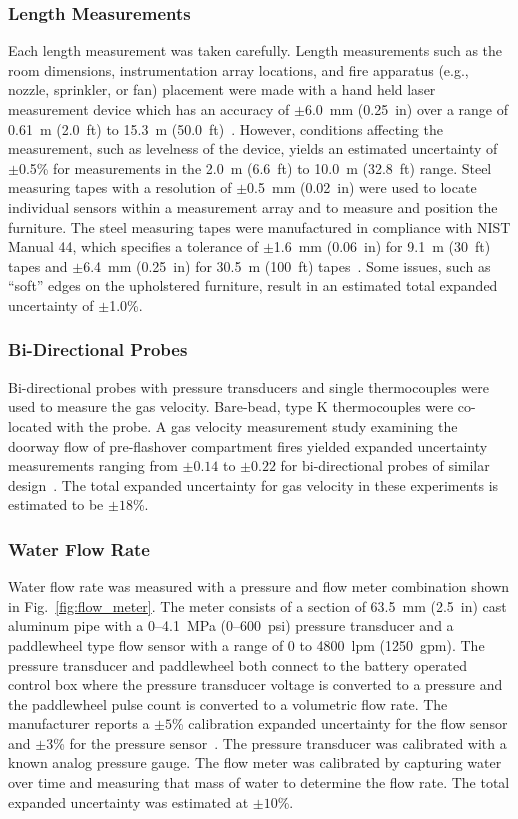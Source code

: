 \documentclass[12pt,oneside]{book}
\begin{document}
\subsubsection{Length Measurements}
Each length measurement was taken carefully. Length measurements such as the room dimensions, instrumentation array locations, and fire apparatus (e.g., nozzle, sprinkler, or fan) placement were made with a hand held laser measurement device which has an accuracy of $\pm$6.0~mm (0.25~in) over a range of 0.61~m (2.0~ft) to 15.3~m (50.0~ft)~\cite{StanleyTools}.  However, conditions affecting the measurement, such as levelness of the device, yields an estimated uncertainty of $\pm$0.5\% for measurements in the 2.0~m (6.6~ft) to 10.0~m (32.8~ft) range. Steel measuring tapes with a resolution of $\pm$0.5~mm (0.02~in) were used to locate individual sensors within a measurement array and to measure and position the furniture. The steel measuring tapes were manufactured in compliance with NIST Manual 44, which specifies a tolerance of $\pm$1.6~mm (0.06~in) for 9.1~m (30~ft) tapes and $\pm$6.4~mm (0.25~in) for 30.5~m (100~ft) tapes~\cite{Butcher:2012}. Some issues, such as ``soft'' edges on the upholstered furniture, result in an estimated total expanded uncertainty of $\pm$1.0\%.

\subsubsection{Bi-Directional Probes}
Bi-directional probes with pressure transducers and single thermocouples were used to measure the gas velocity. Bare-bead, type K thermocouples were co-located with the probe. A gas velocity measurement study examining the doorway flow of pre-flashover compartment fires yielded expanded uncertainty measurements ranging from $\pm0.14$ to $\pm0.22$ for bi-directional probes of similar design~\cite{Bryant:FSJ2009}. The total expanded uncertainty for gas velocity in these experiments is estimated to be $\pm18$\%.   

\subsubsection{Water Flow Rate}
Water flow rate was measured with a pressure and flow meter combination shown in Fig.~\ref{fig:flow_meter}. The meter consists of a section of 63.5~mm (2.5~in) cast aluminum pipe with a 0--4.1~MPa (0--600~psi) pressure transducer and a paddlewheel type flow sensor with a range of 0 to 4800~lpm (1250~gpm). The pressure transducer and paddlewheel both connect to the battery operated control box where the pressure transducer voltage is converted to a pressure and the paddlewheel pulse count is converted to a volumetric flow rate. The manufacturer reports a $\pm5$\% calibration expanded uncertainty for the flow sensor and $\pm3$\% for the pressure sensor~\cite{Akron:2009}. The pressure transducer was calibrated with a known analog pressure gauge. The flow meter was calibrated by capturing water over time and measuring that mass of water to determine the flow rate. The total expanded uncertainty was estimated at $\pm10$\%. 
\end{document}
